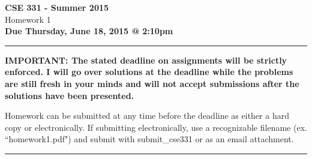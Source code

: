 \documentclass[11pt]{article}
\begin{document}
\begin{center}
{\bf CSE 331 - Summer 2015} \\
 \medskip
{\sc Homework 1}\\
{\bf Due Thursday, June 18, 2015 @ 2:10pm}
\end{center}

\hrule
\vspace*{.3cm}
\noindent
\textbf{IMPORTANT: The stated deadline on assignments will be strictly enforced. I will go over solutions at the deadline while the problems are still fresh in your minds and will not accept submissions after the solutions have been presented.}

\bigskip

Homework can be submitted at any time before the deadline as either a hard copy or electronically. If submitting electronically, use a recognizable filename (ex. ``homework1.pdf") and submit with submit\_cse331 or as an email attachment.

\vspace*{.3cm}
\hrule
\vspace*{.3cm}
\end{document}
